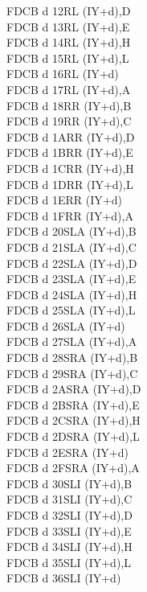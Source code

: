 \documentclass[12pt,twoside,openright,a4paper]{book}
\begin{document}
\begin{multicols}{3}
{\begin{tabbing}
	FDCB d 12\>RL (IY+d),D\UNDOC\\
	FDCB d 13\>RL (IY+d),E\UNDOC\\
	FDCB d 14\>RL (IY+d),H\UNDOC\\
	FDCB d 15\>RL (IY+d),L\UNDOC\\
	FDCB d 16\>RL (IY+d)\\
	FDCB d 17\>RL (IY+d),A\UNDOC\\
	FDCB d 18\>RR (IY+d),B\UNDOC\\
	FDCB d 19\>RR (IY+d),C\UNDOC\\
	FDCB d 1A\>RR (IY+d),D\UNDOC\\
	FDCB d 1B\>RR (IY+d),E\UNDOC\\
	FDCB d 1C\>RR (IY+d),H\UNDOC\\
	FDCB d 1D\>RR (IY+d),L\UNDOC\\
	FDCB d 1E\>RR (IY+d)\\
	FDCB d 1F\>RR (IY+d),A\UNDOC\\
	FDCB d 20\>SLA (IY+d),B\UNDOC\\
	FDCB d 21\>SLA (IY+d),C\UNDOC\\
	FDCB d 22\>SLA (IY+d),D\UNDOC\\
	FDCB d 23\>SLA (IY+d),E\UNDOC\\
	FDCB d 24\>SLA (IY+d),H\UNDOC\\
	FDCB d 25\>SLA (IY+d),L\UNDOC\\
	FDCB d 26\>SLA (IY+d)\\
	FDCB d 27\>SLA (IY+d),A\UNDOC\\
	FDCB d 28\>SRA (IY+d),B\UNDOC\\
	FDCB d 29\>SRA (IY+d),C\UNDOC\\
	FDCB d 2A\>SRA (IY+d),D\UNDOC\\
	FDCB d 2B\>SRA (IY+d),E\UNDOC\\
	FDCB d 2C\>SRA (IY+d),H\UNDOC\\
	FDCB d 2D\>SRA (IY+d),L\UNDOC\\
	FDCB d 2E\>SRA (IY+d)\\
	FDCB d 2F\>SRA (IY+d),A\UNDOC\\
	FDCB d 30\>SLI (IY+d),B\UNDOC\\
	FDCB d 31\>SLI (IY+d),C\UNDOC\\
	FDCB d 32\>SLI (IY+d),D\UNDOC\\
	FDCB d 33\>SLI (IY+d),E\UNDOC\\
	FDCB d 34\>SLI (IY+d),H\UNDOC\\
	FDCB d 35\>SLI (IY+d),L\UNDOC\\
	FDCB d 36\>SLI (IY+d)\UNDOC\\

\end{tabbing}}
\end{multicols}
\end{document}
